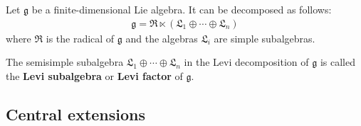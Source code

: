     \begin{theorem}
        Let $\mathfrak{g}$ be a finite-dimensional Lie algebra. It can be decomposed as follows:
        \begin{gather}
            \mathfrak{g} = \mathfrak{R} \ltimes (\mathfrak{L}_1 \oplus \cdots \oplus \mathfrak{L}_n)
        \end{gather}
        where $\mathfrak{R}$ is the radical of $\mathfrak{g}$ and the algebras $\mathfrak{L}_i$ are simple subalgebras.
    \end{theorem}
    \begin{definition}
        The semisimple subalgebra $\mathfrak{L}_1 \oplus \cdots \oplus \mathfrak{L}_n$ in the Levi decomposition of $\mathfrak{g}$ is called the \textbf{Levi subalgebra} or \textbf{Levi factor} of $\mathfrak{g}$.
    \end{definition}

\subsection{Central extensions}\label{section:central_extension_algebra}


